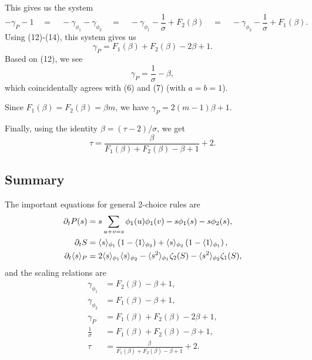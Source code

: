 \documentclass[twoside,10pt]{article}
\begin{document}
This gives us the system
\[
	-\gamma_{P}-1 \quad=\quad -\gamma_{\phi_1}-\gamma_{\phi_2} \quad=\quad -\gamma_{\phi_1}-\frac{1}{\sigma} +F_2(\beta) \quad=\quad -\gamma_{\phi_2}-\frac{1}{\sigma} + F_1(\beta).
\] 
Using (12)-(14), this system gives us
\begin{equation}
	\gamma_{P} = F_1(\beta)+F_2(\beta) - 2\beta + 1.
\end{equation}
Based on (12), we see
\[
\gamma_{P} = \frac{1}{\sigma} -\beta,
\] which coincidentally agrees with (6) and (7) (with $a=b=1$).


\begin{ex}[da Costa]
	Since $F_1(\beta) = F_2(\beta) = \beta m$, we have $\gamma_{P}=2(m-1)\beta+1$.
\end{ex}

Finally, using the identity $\beta = (\tau-2)/\sigma$, we get
\begin{equation}
	\tau = \frac{\beta}{F_1(\beta)+F_2(\beta)-\beta+1} +2.
\end{equation}

\subsection{Summary}

The important equations for general 2-choice rules are
\begin{align*}
	\partial_{t}{P(s)} &= s \sum_{u+v=s} \phi_1(u) \phi_1(v) - s \phi_1(s) - s\phi_2(s),\\
	\partial_{t}{S} &= \langle s \rangle_{\phi_1}\left( 1-\langle 1 \rangle_{\phi_2} \right) + \langle s \rangle_{\phi_2}\left( 1-\langle 1 \rangle_{\phi_1} \right),\\
	\partial_{t}{\langle s \rangle_{P}} &= 2\langle s \rangle_{\phi_1}\langle s \rangle_{\phi_2} - \langle s^2 \rangle_{\phi_1}\zeta_2(S) - \langle s^2 \rangle_{\phi_2}\zeta_1(S),
\end{align*}
and the scaling relations are
\begin{align*}
	\gamma_{\phi_1} &= F_2(\beta) - \beta+1,\\
	\gamma_{\phi_2} &= F_1(\beta)-\beta+1,\\
	\gamma_{P} &= F_1(\beta) + F_2(\beta)-2\beta+1,\\
	\frac{1}{\sigma} &= F_1(\beta)+F_2(\beta)-\beta+1,\\
	\tau &= \frac{\beta}{F_1(\beta)+F_2(\beta)-\beta+1} +2.
\end{align*}
\end{document}
